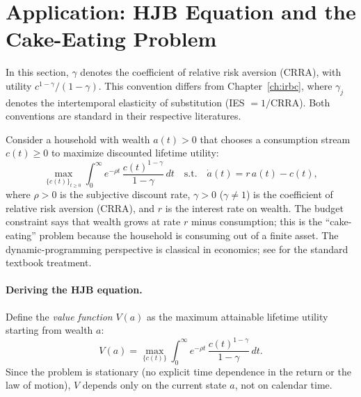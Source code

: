 \documentclass[11pt,a4paper]{report}
\begin{document}
\section{Application: HJB Equation and the Cake-Eating Problem}

\begin{remarkbox}
In this section, $\gamma$ denotes the coefficient of relative risk aversion (CRRA), with utility $c^{1-\gamma}/(1-\gamma)$.  This convention differs from Chapter~\ref{ch:irbc}, where $\gamma_j$ denotes the intertemporal elasticity of substitution (IES $= 1/\text{CRRA}$).  Both conventions are standard in their respective literatures.
\end{remarkbox}

Consider a household with wealth $a(t) > 0$ that chooses a consumption stream $c(t) \geq 0$ to maximize discounted lifetime utility:
\begin{equation}
\max_{\{c(t)\}_{t \geq 0}} \int_0^\infty e^{-\rho t}\,\frac{c(t)^{1-\gamma}}{1-\gamma}\,dt
\quad\text{s.t.}\quad \dot{a}(t) = r\,a(t) - c(t),
\label{eq:cake_problem}
\end{equation}
where $\rho > 0$ is the subjective discount rate, $\gamma > 0$ ($\gamma \neq 1$) is the coefficient of relative risk aversion (CRRA), and $r$ is the interest rate on wealth.  The budget constraint says that wealth grows at rate $r$ minus consumption; this is the ``cake-eating'' problem because the household is consuming out of a finite asset.
The dynamic-programming perspective is classical in economics; see \citet{stokeylucas1989} for the standard textbook treatment.

\paragraph{Deriving the HJB equation.}
Define the \emph{value function} $V(a)$ as the maximum attainable lifetime utility starting from wealth $a$:
\begin{equation}
V(a) = \max_{\{c(t)\}} \int_0^\infty e^{-\rho t}\,\frac{c(t)^{1-\gamma}}{1-\gamma}\,dt.
\label{eq:cake_value}
\end{equation}
Since the problem is stationary (no explicit time dependence in the return or the law of motion), $V$ depends only on the current state $a$, not on calendar time.
\end{document}
